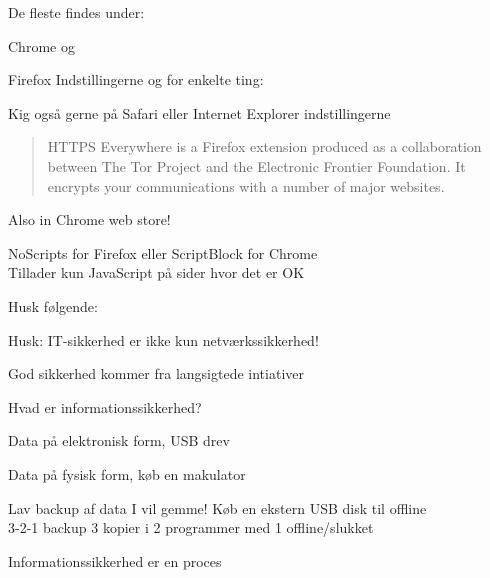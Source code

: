 \documentclass[20pt,landscape,a4paper]{foils}
\begin{document}


De fleste findes under:
\begin{list2}
\item Chrome  og 
\item Firefox Indstillingerne og for enkelte ting: 
\end{list2}

\centerline{Kig også gerne på Safari eller Internet Explorer indstillingerne}




\begin{quote}
HTTPS Everywhere is a Firefox extension produced as a collaboration between The Tor Project and the Electronic Frontier Foundation. It encrypts your communications with a number of major websites.
\end{quote}

\centerline{}

Also in Chrome web store!




\vskip 2cm
NoScripts for Firefox eller ScriptBlock for Chrome\\
Tillader kun JavaScript på sider hvor det er OK



\begin{list1}
\item Husk følgende:
\begin{list2}
\item Husk: IT-sikkerhed er ikke kun netværkssikkerhed!
\item God sikkerhed kommer fra langsigtede intiativer
\item Hvad er informationssikkerhed?
\item Data på elektronisk form, USB drev
\item Data på fysisk form, køb en makulator
\item Lav backup af data I vil gemme! Køb en ekstern USB disk til offline\\
3-2-1 backup 3 kopier i 2 programmer med 1 offline/slukket
\end{list2}
\end{list1}
\vskip 1cm
\centerline{\color{titlecolor}\LARGE Informationssikkerhed er en proces}
\end{document}
